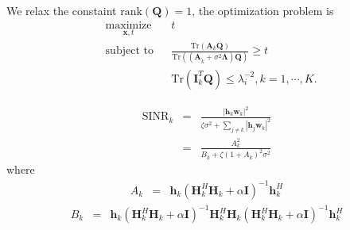 \documentclass[12pt,journal,draftclsnofoot,onecolumn]{IEEEtran}
\begin{document}
We relax the constaint $\mathrm{rank}(\mathbf{Q}) = 1$,
the optimization problem is
\begin{equation}
\begin{aligned} \label{eq:problem2}
& \underset{\mathbf{x},t}{\text{maximize}}
& & t \\
& \text{subject to}
& &  \frac{\mathrm{Tr}\left(\mathbf{A}_k\mathbf{Q}\right)}{\mathrm{Tr}\left(\left(\mathbf{A}_{\tilde{k}} + \sigma^2\mathbf{\Lambda}\right)\mathbf{Q}\right)} \geq t\\
&&&\mathrm{Tr}\left(\mathbf{I}_k^T\mathbf{Q}\right) \leq \lambda_i^{-2}, k=1, \cdots, K.
\end{aligned}
\end{equation}




\begin{eqnarray}
\mathrm{SINR}_{k} &=& \frac{|\mathbf{h}_k\mathbf{w}_k|^2}{\zeta\sigma^2 + \sum_{j \neq k} |\mathbf{h}_j\mathbf{w}_k|^2}\\
&=& \frac{A_k^2}{B_k + \zeta(1+A_k)^2\sigma^2}
\end{eqnarray}
where
\begin{eqnarray}
A_k &=& \mathbf{h}_k\left(\mathbf{H}_k^H\mathbf{H}_k + \alpha\mathbf{I}\right)^{-1}\mathbf{h}_k^H
\end{eqnarray}
\begin{eqnarray}
B_k &=& \mathbf{h}_k\left(\mathbf{H}_k^H\mathbf{H}_k + \alpha\mathbf{I}\right)^{-1}\mathbf{H}_k^H\mathbf{H}_k\left(\mathbf{H}_k^H\mathbf{H}_k + \alpha\mathbf{I}\right)^{-1}\mathbf{h}_k^H \label{eq:B_k}
\end{eqnarray}
\end{document}
